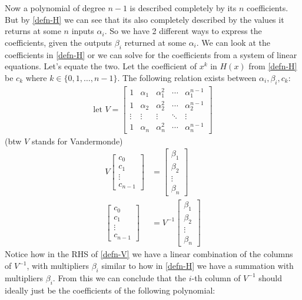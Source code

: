 \documentclass{article}
\begin{document}
Now a polynomial of degree $n-1$ is described completely by its $n$ coefficients. But by \eqref{defn-H} we can see that its also completely described by the values it returns at some $n$ inputs $\alpha_i$. So we have 2 different ways to express the coefficients, given the outputs $\beta_i$ returned at some $\alpha_i$. We can look at the coefficients in \eqref{defn-H} or we can solve for the coefficients from a system of linear equations. Let's equate the two. Let the coefficient of $x^k$ in $H(x)$ from \eqref{defn-H} be $c_k$ where $k \in \{0,1,\dots,n-1\}$. The following relation exists between $\alpha_i, \beta_i, c_k$:
\begin{align}
    \textrm{let } V = 
    \begin{bmatrix}
        1 & \alpha_1 & \alpha_1^2 & \cdots & \alpha_1^{n-1} \\
        1 & \alpha_2 & \alpha_2^2 & \cdots & \alpha_2^{n-1} \\
        \vdots & \vdots & \vdots & \ddots & \vdots \\
        1 & \alpha_n & \alpha_n^2 & \cdots & \alpha_n^{n-1}
    \end{bmatrix}
\end{align}
(btw $V$ stands for Vandermonde)
\begin{align}
    V \begin{bmatrix}c_0 \\ c_1 \\ \vdots \\ c_{n-1}\end{bmatrix} &= \begin{bmatrix}\beta_1 \\ \beta_2 \\ \vdots \\ \beta_{n} \end{bmatrix} \\
    \begin{bmatrix}c_0 \\ c_1 \\ \vdots \\ c_{n-1}\end{bmatrix} &= V^{-1} \begin{bmatrix}\beta_1 \\ \beta_2 \\ \vdots \\ \beta_{n} \end{bmatrix} \label{defn-V}
\end{align}
Notice how in the RHS of \eqref{defn-V} we have a linear combination of the columns of $V^{-1}$, with multipliers $\beta_i$ similar to how in \eqref{defn-H} we have a summation with multipliers $\beta_i$. From this we can conclude that the $i$-th column of $V^{-1}$ should ideally just be the coefficients of the following polynomial:
\end{document}
